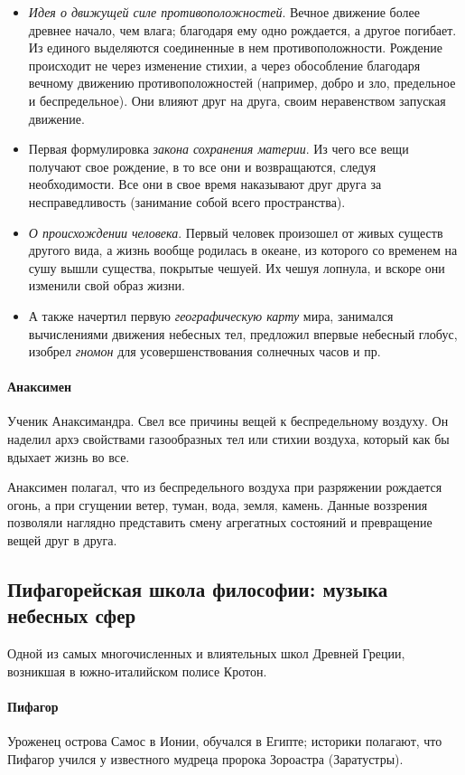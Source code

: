 \begin{itemize}
    \item \textit{Идея о движущей силе противоположностей}. Вечное движение более древнее начало, чем влага; благодаря ему одно рождается, а другое погибает. Из единого выделяются соединенные в нем противоположности.  Рождение происходит не через изменение стихии, а через обособление благодаря вечному движению противоположностей (например, добро и зло, предельное и беспредельное). Они влияют друг на друга, своим неравенством запуская движение.
    \item Первая формулировка \textit{закона сохранения материи}. Из чего все вещи получают свое рождение, в то все они и возвращаются, следуя необходимости. Все они в свое время наказывают друг друга за несправедливость (занимание собой всего пространства).
    \item \textit{О происхождении человека}. Первый человек произошел от живых существ другого вида, а жизнь вообще родилась в океане, из которого со временем на сушу вышли существа, покрытые чешуей. Их чешуя лопнула, и вскоре они изменили свой образ жизни.
    \item А также начертил первую \textit{географическую карту} мира, занимался вычислениями движения небесных тел, предложил впервые небесный глобус, изобрел \textit{гномон} для усовершенствования солнечных часов и пр.
\end{itemize}

\paragraph{Анаксимен} Ученик Анаксимандра. Свел все причины вещей к беспредельному
воздуху. Он наделил архэ свойствами газообразных тел или стихии воздуха, который как бы вдыхает жизнь во все.  

Анаксимен полагал, что из беспредельного воздуха при разряжении рождается огонь, а при сгущении ветер, туман, вода, земля, камень. Данные воззрения позволяли наглядно представить смену агрегатных состояний и превращение вещей друг в друга.

\subsection{Пифагорейская школа философии: музыка небесных сфер}

Одной из самых многочисленных и влиятельных школ Древней Греции, возникшая в южно-италийском полисе Кротон. 

\paragraph{Пифагор} Уроженец острова Самос в Ионии, обучался в Египте; историки полагают, что Пифагор учился у известного мудреца пророка Зороастра (Заратустры).

